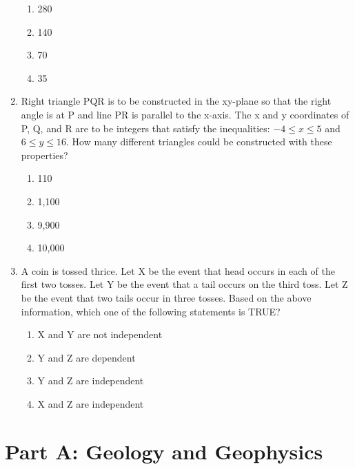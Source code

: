\documentclass[journal,12pt,onecolumn]{IEEEtran}
\theoremstyle{remark}
\begin{document}
\begin{enumerate}
\begin{multicols}{4}
\begin{enumerate}
\item 280  
\item 140  
\item 70  
\item 35  
\end{enumerate}
\end{multicols}

\item Right triangle PQR is to be constructed in the xy-plane so that the right angle is at P and line PR is parallel to the x-axis.  
The x and y coordinates of P, Q, and R are to be integers that satisfy the inequalities: \(-4 \leq x \leq 5\) and \(6 \leq y \leq 16\).  
How many different triangles could be constructed with these properties?  
\begin{multicols}{2}
\begin{enumerate}
\item 110  
\item 1,100  
\item 9,900  
\item 10,000  
\end{enumerate}
\end{multicols}

\item A coin is tossed thrice. Let X be the event that head occurs in each of the first two tosses.  
Let Y be the event that a tail occurs on the third toss.  
Let Z be the event that two tails occur in three tosses.  
Based on the above information, which one of the following statements is TRUE?  
\begin{multicols}{2}
\begin{enumerate}
\item X and Y are not independent  
\item Y and Z are dependent  
\item Y and Z are independent  
\item X and Z are independent  
\end{enumerate}
\end{multicols}

\end{enumerate}

\section*{Part A: Geology and Geophysics }
\vspace{0.5cm}
\end{document}
